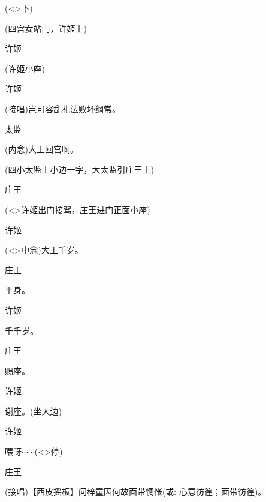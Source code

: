 {(\textless{}\!\textgreater{}下)

\vspace{5pt}

(四宫女站门，许姬上)

许姬


(许姬小座)

许姬\hspace{30pt}~

({\akai 接唱})岂可容乱礼法败坏纲常。

太监\hspace{30pt}~

({\akai 内}念)大王回宫啊。

(四小太监上小边一字，大太监引庄王上)

庄王\hspace{30pt}~


(\textless{}\!\textgreater{}许姬出门接驾，庄王进门正面小座)

许姬\hspace{30pt}~

(\textless{}\!\textgreater{}中念)大王千岁。

庄王\hspace{30pt}~

平身。

许姬\hspace{30pt}~

千千岁。

庄王\hspace{30pt}~

赐座。

许姬\hspace{30pt}~

谢座。(坐大边)

许姬\hspace{30pt}~

喂呀$\cdots{}\cdots{}$(\textless{}\!\textgreater{}停)

庄王\hspace{30pt}~

({\akai 接唱})【{\akai 西皮摇板}】问梓童因何故面带惆怅({\akai 或}: 心意彷徨；面带彷徨)。

}
